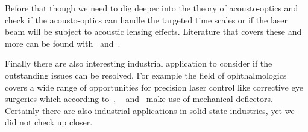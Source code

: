 Before that though we need to dig deeper into the theory of acousto-optics
and check if the acousto-optics can handle the targeted time scales or if
the laser beam will be subject to acoustic lensing effects. Literature that
covers these and more can be found with~\cite{Goutzoulis1994}
and~\cite{Royer1999}.

Finally there are also interesting industrial application to consider if the
outstanding issues can be resolved. For example the field of ophthalmologics
covers a wide range of opportunities for precision laser control like
corrective eye surgeries which according to~\cite{US20180110655},
~\cite{US20180064579} and~\cite{US7131968} make use of mechanical deflectors.
Certainly there are also industrial applications in solid-state industries,
yet we did not check up closer.
